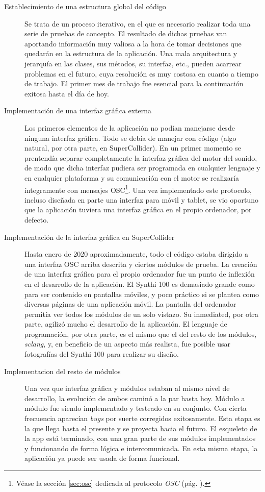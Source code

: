 \begin{description} 
	\item[Establecimiento de una estructura global del código] Se trata de un proceso iterativo, en el que es necesario realizar toda una serie de pruebas de concepto. El resultado de dichas pruebas van aportando información muy valiosa a la hora de tomar decisiones que quedarán en la estructura de la aplicación. Una mala arquitectura y jerarquía en las clases, sus métodos, su interfaz, etc., pueden acarrear problemas en el futuro, cuya resolución es muy costosa en cuanto a tiempo de trabajo. El primer mes de trabajo fue esencial para la continuación exitosa hasta el día de hoy.
	
	\item[Implementación de una interfaz gráfica externa] Los primeros elementos de la aplicación no podían manejarse desde ninguna interfaz gráfica. Todo se debía de manejar con código (algo natural, por otra parte, en SuperCollider). En un primer momento se prentendía separar completamente la interfaz gráfica del motor del sonido, de modo que dicha interfaz pudiera ser programada en cualquier lenguaje y en cualquier plataforma y su comunicación con el motor se realizaría íntegramente con mensajes OSC\footnote{Véase la sección \ref{sec:osc} dedicada al protocolo \textit{OSC} (pág. \pageref{sec:osc}).}. Una vez implementado este protocolo, incluso diseñada en parte una interfaz para móvil y tablet, se vio oportuno que la aplicación tuviera una interfaz gráfica en el propio ordenador, por defecto.
	
	\item[Implementación de la interfaz gráfica en SuperCollider] Hasta enero de 2020 aproximadamente, todo el código estaba dirigido a una interfaz OSC arriba descrita y ciertos módulos de prueba. La creación de una interfaz gráfica para el propio ordenador fue un punto de inflexión en el desarrollo de la aplicación. El Synthi 100 es demasiado grande como para ser contenido en pantallas móviles, y poco práctico si se plantea como diversas páginas de una aplicación móvil. La pantalla del ordenador permitía ver todos los módulos de un solo vistazo. Su inmediated, por otra parte, agilizó mucho el desarrollo de la aplicación. El lenguaje de programación, por otra parte, es el mismo que el del resto de los módulos, \textit{sclang}, y, en beneficio de un aspecto más realista, fue posible usar fotografías del Synthi 100 para realizar su diseño.
	
	\item[Implementacion del resto de módulos] Una vez que interfaz gráfica y módulos estaban al mismo nivel de desarrollo, la evolución de ambos caminó a la par hasta hoy. Módulo a módulo fue siendo implementado y testeado en su conjunto. Con cierta frecuencia aparecían \textit{bugs} por suerte corregidos exitosamente. Esta etapa es la que llega hasta el presente y se proyecta hacia el futuro. El esqueleto de la app está terminado, con una gran parte de sus módulos implementados y funcionando de forma lógica e intercomunicada. En esta misma etapa, la aplicación ya puede ser usada de forma funcional.
\end{description}




